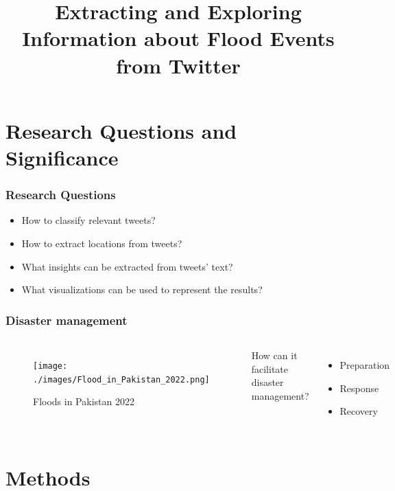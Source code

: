 \documentclass{beamer}
\title %
{Extracting and Exploring Information about Flood Events from Twitter}
\institute[VFU] %
{

}
\date %
\begin{document}


\section{Research Questions and Significance}

\begin{frame}
  \frametitle{Research Questions}
  \begin{itemize} 
    \item How to classify relevant tweets?
    \item How to extract locations from tweets?
    \item What insights can be extracted from tweets' text?
    \item What visualizations can be used to represent the results? 
  \end{itemize}
\end{frame}

\begin{frame}
  \frametitle{Disaster management}
  \begin{columns}[T]
    \begin{figure}
      \texttt{[image: ./images/Flood\_in\_Pakistan\_2022.png]}
      \caption{Floods in Pakistan 2022\footnotemark}
    \end{figure}
  \pause
  How can it facilitate disaster management?
  \begin{itemize}
    \item Preparation
    \item Response
    \item Recovery
  \end{itemize}
  \end{columns}
\end{frame}


\section{Methods}
\end{document}
